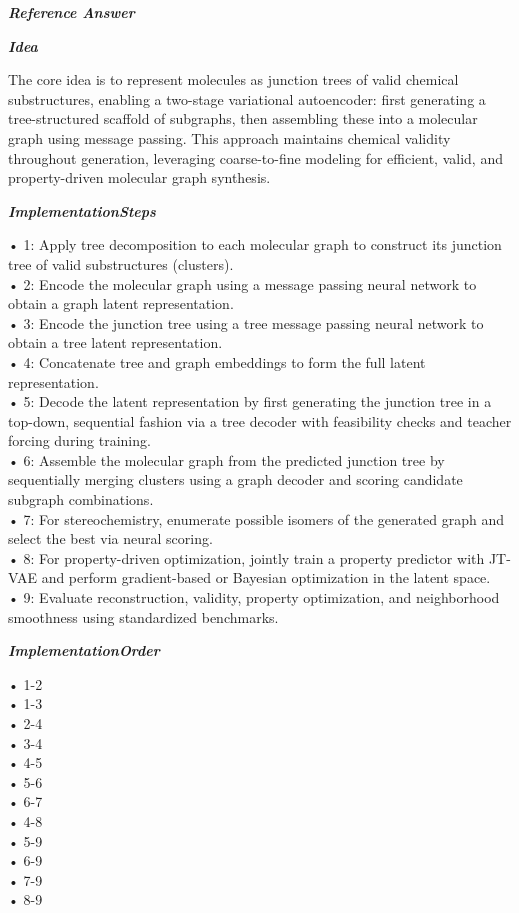 \begin{tcolorbox}[
    breakable,
    title={Example of Idea Generation in Chemistry},
    colback=LighterGray,
    colframe=DeepPurple,
    colbacktitle=DeepPurple,
    coltitle=White,
]
\textbf{\emph{\textcolor{DeepPurple}{Reference Answer}}}

\textbf{\emph{\textcolor{CaseOrange}{Idea}}}

The core idea is to represent molecules as junction trees of valid chemical substructures, enabling
a two-stage variational autoencoder: first generating a tree-structured scaffold of subgraphs, then
assembling these into a molecular graph using message passing. This approach maintains chemical
validity throughout generation, leveraging coarse-to-fine modeling for efficient, valid, and
property-driven molecular graph synthesis.

\textbf{\emph{\textcolor{CaseOrange}{ImplementationSteps}}}

• 1: Apply tree decomposition to each molecular graph to construct its junction tree of valid substructures (clusters). \\
• 2: Encode the molecular graph using a message passing neural network to obtain a graph latent representation. \\
• 3: Encode the junction tree using a tree message passing neural network to obtain a tree latent representation. \\
• 4: Concatenate tree and graph embeddings to form the full latent representation. \\
• 5: Decode the latent representation by first generating the junction tree in a top-down, sequential fashion via a tree decoder with feasibility checks and teacher forcing during training. \\
• 6: Assemble the molecular graph from the predicted junction tree by sequentially merging clusters using a graph decoder and scoring candidate subgraph combinations. \\
• 7: For stereochemistry, enumerate possible isomers of the generated graph and select the best via neural scoring. \\
• 8: For property-driven optimization, jointly train a property predictor with JT-VAE and perform gradient-based or Bayesian optimization in the latent space. \\
• 9: Evaluate reconstruction, validity, property optimization, and neighborhood smoothness using standardized benchmarks. 

\textbf{\emph{\textcolor{CaseOrange}{ImplementationOrder}}}

• 1-2 \\
• 1-3 \\
• 2-4 \\
• 3-4 \\
• 4-5 \\
• 5-6 \\
• 6-7 \\
• 4-8 \\
• 5-9 \\
• 6-9 \\
• 7-9 \\
• 8-9 


\end{tcolorbox}
